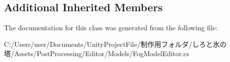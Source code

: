\subsection*{Additional Inherited Members}


The documentation for this class was generated from the following file\+:\begin{DoxyCompactItemize}
\item 
C\+:/\+Users/user/\+Documents/\+Unity\+Project\+File/制作用フォルダ/しろと氷の塔/\+Assets/\+Post\+Processing/\+Editor/\+Models/Fog\+Model\+Editor.\+cs\end{DoxyCompactItemize}
